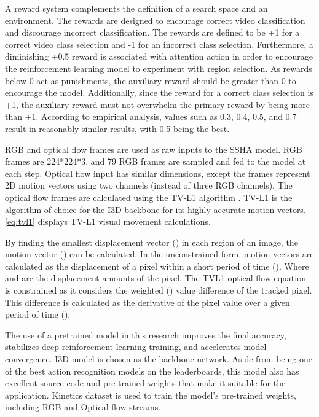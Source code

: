 \documentclass[review]{elsarticle}
\begin{document}
{A reward system complements the definition of a search space and an environment. The rewards are designed to encourage correct video classification and discourage incorrect classification. The rewards are defined to be +1 for a correct video class selection and -1 for an incorrect class selection. Furthermore, a diminishing +0.5 reward is associated with attention action in order to encourage the reinforcement learning model to experiment with region selection. As rewards below 0 act as punishments, the auxiliary reward should be greater than 0 to encourage the model. Additionally, since the reward for a correct class selection is +1, the auxiliary reward must not overwhelm the primary reward by being more than +1. According to empirical analysis, values such as 0.3, 0.4, 0.5, and 0.7 result in reasonably similar results, with 0.5 being the best.}

RGB and optical flow frames are used as raw inputs to the SSHA model. RGB frames are 224*224*3, and 79 RGB frames are sampled and fed to the model at each step. Optical flow input has similar dimensions, except the frames represent 2D motion vectors using two channels (instead of three RGB channels). The optical flow frames are calculated using the TV-L1 algorithm \citep{carreira2017quo}. TV-L1 is the algorithm of choice for the I3D backbone \citep{carreira2017quo} for its highly accurate motion vectors. \autoref{eq:tvl1} displays TV-L1 visual movement calculations.



{By finding the smallest displacement vector () in each region of an image, the motion vector () can be calculated. In the unconstrained form, motion vectors are calculated as the displacement of a pixel within a short period of time (). Where  and  are the displacement amounts of the pixel. The TVL1 optical-flow equation is constrained as it considers the weighted () value difference of the tracked pixel. This difference is calculated as the derivative of the pixel value over a given period of time ().}

The use of a pretrained model in this research improves the final accuracy, stabilizes deep reinforcement learning training, and accelerates model convergence. I3D model \citep{carreira2017quo} is chosen as the backbone network. Aside from being one of the best action recognition models on the leaderboards, this model also has excellent source code and pre-trained weights that make it suitable for the application. Kinetics dataset \citep{smaira2020short} is used to train the model's pre-trained weights, including RGB and Optical-flow streams.
\end{document}
